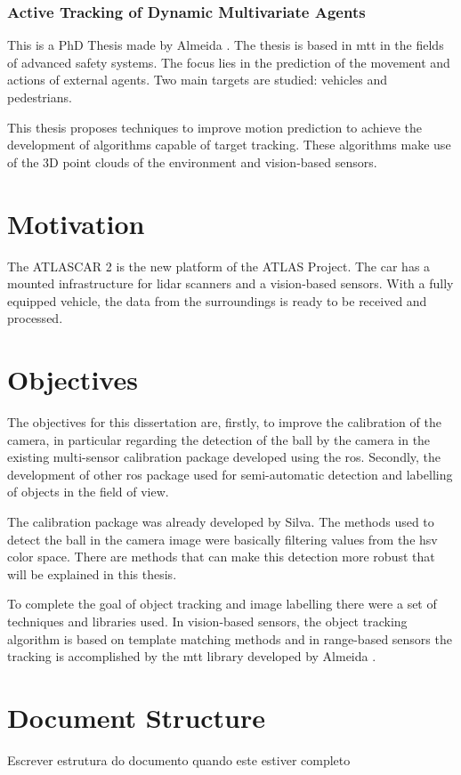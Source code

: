 \subsubsection{Active Tracking of Dynamic Multivariate Agents} 

This is a PhD Thesis made by Almeida \cite{SoaresDeAlmeida2016a}. The thesis is based in \gls{mtt} in the fields of advanced safety systems. The focus lies in the prediction of the movement and actions of external agents. Two main targets are studied: vehicles and pedestrians. 

This thesis proposes techniques to improve motion prediction to achieve the development of algorithms capable of target tracking. These algorithms make use of the 3D point clouds of the environment and vision-based sensors. 


\section{Motivation}
The ATLASCAR 2 is the new platform of the ATLAS Project. The car has a mounted infrastructure for \gls{lidar} scanners and a vision-based sensors. With a fully equipped vehicle, the data from the surroundings is ready to be received and processed.

\section{Objectives}
The objectives for this dissertation are, firstly, to improve the calibration of the camera, in particular regarding the detection of the ball by the camera in the existing multi-sensor calibration package developed using the \gls{ros}. Secondly, the development of other \gls{ros} package used for semi-automatic detection and labelling of objects in the field of view.

The calibration package was already developed by Silva\cite{VieiradaSilva2016}. The methods used to detect the ball in the camera image were basically filtering  values from the \gls{hsv} color space. There are methods that can make this detection more robust that will be explained in this thesis. 

To complete the goal of object tracking and image labelling there were a set of techniques and libraries used. In vision-based sensors, the object tracking algorithm is based on template matching methods and in range-based sensors the tracking is accomplished by the \gls{mtt} library developed by Almeida \cite{SoaresDeAlmeida2016a}.

\section{Document Structure}

Escrever estrutura do documento quando este estiver completo

